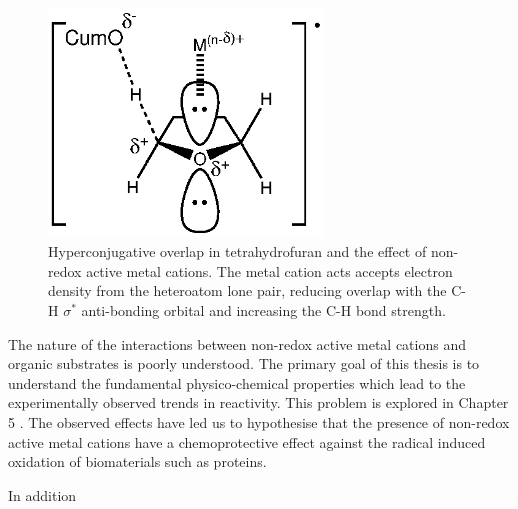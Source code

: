 \begin{figure}[htb]
  \centering
  \includegraphics[width=0.65\textwidth]{figures/THF}
  \caption[Hyperconjugative overlap in tetrahydrofuran and the effect of non-redox active metal cations.]
  {Hyperconjugative overlap in tetrahydrofuran and the effect of non-redox active metal cations. The metal cation acts accepts electron density from the heteroatom lone pair, reducing overlap with the C-H $\sigma^*$ anti-bonding orbital and increasing the C-H bond strength.}
  \label{fig:THF}
\end{figure}

The nature of the interactions between non-redox active metal cations and
organic substrates is poorly understood. The primary goal of this thesis is to
understand the fundamental physico-chemical properties which lead to the
experimentally observed trends in reactivity. This problem is explored in
Chapter 5 . The observed effects have led
us to hypothesise that the presence of non-redox active metal cations have a
chemoprotective effect against the radical induced oxidation of biomaterials
such as proteins.

In addition 

%
